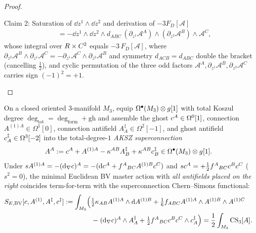 \begin{proof}
\begin{proofpart}{Claim 2: Saturation of $\dd z^1\wedge\dd z^2$ and derivation of $-3 F_D[\mathcal{A}]$}
\[\begin{aligned}
&\quad = -\dd z^1\wedge\dd z^2\wedge d_{ABC}\,(\partial_{z^1}\mathcal{A}^A)\wedge(\partial_{z^2}\mathcal{A}^B)\wedge\mathcal{A}^C,
\end{aligned}
\]
whose integral over $R\times C^2$ equals $-3\,F_D[\mathcal{A}]$, where $\partial_{z^2}\mathcal{A}^B\wedge\partial_{z^1}\mathcal{A}^C = -\partial_{z^1}\mathcal{A}^C\wedge\partial_{z^2}\mathcal{A}^B$ and symmetry $d_{ACB} = d_{ABC}$ double the bracket (cancelling $\frac{1}{2}$), and cyclic permutation of the three odd factors $\mathcal{A}^A, \partial_{z^1}\mathcal{A}^B, \partial_{z^2}\mathcal{A}^C$ carries sign $(-1)^2 = +1$.
\end{proofpart}
\end{proof}

\begin{proposition}[{Right-placed antifields, $\delta_\epsilon A^{(1)} = -\dd_\nabla\epsilon$, and AKSZ superconnection equivalence~{\cite{AKSZ97}}}]
\label{prop:bv-aksz-cs}
On a closed oriented $3$-manifold $M_3$, equip $\Omega^\bullet(M_3)\otimes g[1]$ with total Koszul degree $\deg_{\mathrm{tot}} = \deg_{\mathrm{form}} + \mathrm{gh}$ and assemble the ghost $c^A \in \Omega^0[1]$, connection $A^{(1)A} \in \Omega^1[0]$, connection antifield $A^\ddagger_A \in \Omega^2[-1]$, and ghost antifield $c^\ddagger_A \in \Omega^3[-2]$ into the total-degree-$1$ \emph{AKSZ superconnection}~\cite{AKSZ97}
\begin{equation}
\label{eq:aksz-superconnection}
A^A := c^A + A^{(1)A} - \kappa^{AB}A^\ddagger_B + \kappa^{AB}c^\ddagger_B \in \Omega^\bullet(M_3)\otimes g[1].
\end{equation}
Under $s A^{(1)A} = -(\mathrm{d}_\nabla c)^A = -(\mathrm{d}c^A + f^A{}_{BC}A^{(1)B}c^C)$ and $sc^A = +\frac{1}{2}f^A{}_{BC}c^Bc^C$ ($s^2 = 0$), the minimal Euclidean BV master action with \emph{all antifields placed on the right} coincides term-for-term with the superconnection Chern--Simons functional:
\begin{equation}
\label{eq:bv-equals-aksz}
\begin{aligned}
S_{E,\mathrm{BV}}[c,A^{(1)},A^\ddagger,c^\ddagger] &:= \int_{M_3}\!\left(\tfrac{1}{2}\kappa_{AB}A^{(1)A}\wedge\mathrm{d} A^{(1)B} + \tfrac{1}{6}f_{ABC}A^{(1)A}\wedge A^{(1)B}\wedge A^{(1)C}\right.\\
&\qquad\qquad\left. -\; (\mathrm{d}_\nabla c)^A\wedge A^\ddagger_A + \tfrac{1}{2}f^A{}_{BC}c^Bc^C\wedge c^\ddagger_A\right) = \frac{1}{2}\int_{M_3}\mathrm{CS}_3[A].
\end{aligned}
\end{equation}
\end{proposition}

